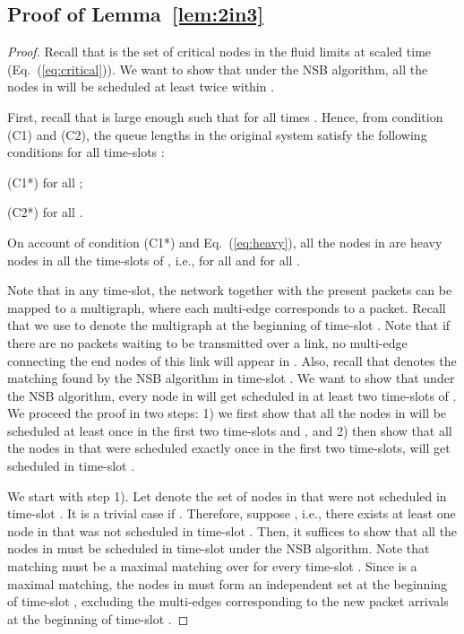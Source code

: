 \documentclass[10pt,journal,compsoc]{IEEEtran}
\newcommand{\high}[1]{{\color{black}{#1}}}
\begin{document}
\subsection{Proof of Lemma~\ref{lem:2in3}} \label{sec:lem:2in3}
\begin{proof}
Recall that  is the set of critical nodes in the fluid limits at scaled time  (Eq.~(\ref{eq:critical})).
We want to show that under the NSB algorithm, all the nodes in  will be scheduled at least 
twice within \high{each frame of interval }.

First, recall that  is large enough such that 
 for all times
. Hence, from condition (C1) and (C2), the queue lengths 
in the original system satisfy the following conditions for all time-slots : 

(C1*)  for all ;

(C2*)  for all .

\noindent On account of condition (C1*) and Eq.~(\ref{eq:heavy}), all the 
nodes in  are heavy nodes in all the time-slots of , i.e., 
 for all  and for all .

Note that in any time-slot, the network together with the present packets can be mapped to a 
multigraph, where each multi-edge corresponds to a packet. Recall that we use  to 
denote the multigraph at the beginning of time-slot . Note that if there are no packets waiting 
to be transmitted over a link, no multi-edge connecting the end nodes of this link will appear in 
. Also, recall that  denotes the matching found by the NSB algorithm in time-slot . 
\high{Now, consider any frame  of interval  consisting of three consecutive time-slots 
, where .} 
We want to show that under the NSB algorithm, every node in 
 will get scheduled in at least two time-slots of . We proceed the proof in 
two steps: 1) we first show that all the nodes in  will be scheduled at least once in the first 
two time-slots  and , and 2) then show that all the nodes in  that were scheduled 
exactly once in the first two time-slots, will get scheduled in time-slot . 

We start with step 1). Let  denote the set of nodes in  that were not 
scheduled in time-slot . It is a trivial case if . Therefore, 
suppose , i.e., there exists at least one node in  that 
was not scheduled in time-slot . Then, it suffices to show that all the nodes in  
must be scheduled in time-slot  under the NSB algorithm. Note that matching  
must be a maximal matching over  for every time-slot . Since  is 
a maximal matching, the nodes in  must form an independent set at the 
beginning of time-slot , excluding the multi-edges corresponding to the new packet 
arrivals at the beginning of time-slot . 


\end{proof}
\end{document}
